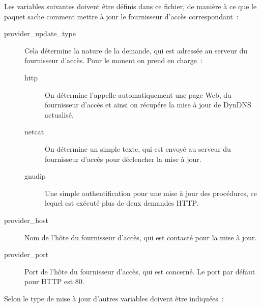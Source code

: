 Les variables suivantes doivent être définis dans ce fichier, de manière à ce
que le paquet sache comment mettre à jour le fournisseur d'accès correspondant~:

\begin{description}
\item[provider\_update\_type] Cela détermine la nature de la demande, qui est
    adressée au serveur du fournisseur d'accès. Pour le monent on prend en charge~:
  \begin{description}
  \item[http] On détermine l'appelle automatiquement une page Web, du fournisseur
    d'accès et ainsi on récupére la mise à jour de DynDNS actualisé.
  \item[netcat] On détermine un simple texte, qui est envoyé au serveur du
    fournisseur d'accès pour déclencher la mise à jour.
  \item[gnudip] Une simple authentification pour une mise à jour des procédures,
    ce lequel est exécuté plus de deux demandes HTTP.
  \end{description}
\item[provider\_host] Nom de l'hôte du fournisseur d'accès, qui est contacté
  pour la  mise à jour.
\item[provider\_port] Port de l'hôte du fournisseur d'accès, qui est concerné.
  Le port par défaut pour HTTP est 80.
\end{description}
  
Selon le type de mise à jour d'autres variables doivent être indiquées~:

